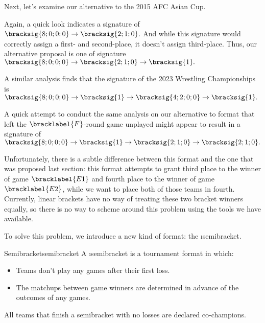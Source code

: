 {    

    Next, let's examine our alternative to the 2015 AFC Asian Cup.


    Again, a quick look indicates a signature of $\bracksig{8;0;0;0} \to \bracksig{2;1;0}$. And while this signature would correctly assign a first- and second-place, it doesn't assign third-place. Thus, our alternative proposal is one of signature $\bracksig{8;0;0;0} \to \bracksig{2;1;0} \to \bracksig{1}.$


    A similar analysis finds that the signature of the 2023 Wrestling Championships is $\bracksig{8;0;0;0} \to \bracksig{1} \to \bracksig{4;2;0;0} \to \bracksig{1}.$


    A quick attempt to conduct the same analysis on our alternative to format that left the $\bracklabel{F}$-round game unplayed might appear to result in a signature of $\bracksig{8;0;0;0} \to \bracksig{1} \to \bracksig{2;1;0} \to \bracksig{2;1;0}.$


    Unfortunately, there is a subtle difference between this format and the one that was proposed last section: this format attempts to grant third place to the winner of game $\bracklabel{E1}$ and fourth place to the winner of game $\bracklabel{E2}$, while we want to place both of those teams in fourth. Currently, linear brackets have no way of treating these two bracket winners equally, so there is no way to scheme around this problem using the tools we have available.

    To solve this problem, we introduce a new kind of format: the \i{semibracket}. %

    \begin{definition}{Semibracket}{semibracket}
        A \i{semibracket} is a tournament format in which:
        \begin{itemize}
            \item Teams don't play any games after their first loss.
            \item The matchups between game winners are determined in advance of the outcomes of any games. %
        \end{itemize}
        All teams that finish a semibracket with no losses are declared co-champions.
    \end{definition}

}
